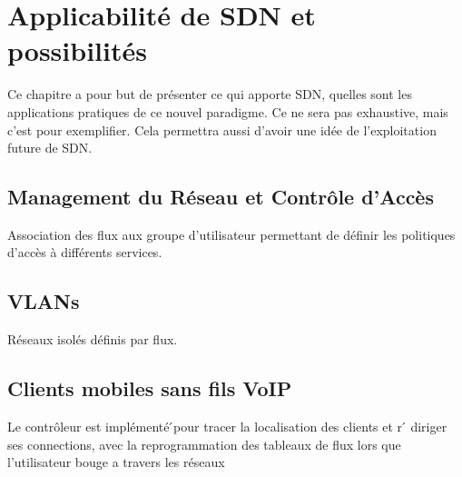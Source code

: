 \chapter{Applicabilité de SDN et possibilités}

Ce chapitre a pour but de présenter ce qui apporte SDN, quelles sont les applications pratiques de ce nouvel paradigme. Ce ne sera pas exhaustive, mais c'est pour exemplifier. Cela permettra aussi d'avoir une idée de l'exploitation future de SDN.

\section{Management du Réseau et Contrôle d'Accès}
Association des flux aux groupe d'utilisateur permettant de définir les politiques d'accès à différents services.

\section{VLANs}
Réseaux isolés définis par flux.

\section{Clients mobiles sans fils VoIP}


Le contrôleur est implémenté ́pour tracer la localisation des clients et r ́ diriger ses connections, avec la reprogrammation des tableaux de flux lors que l’utilisateur bouge a travers
les réseaux
